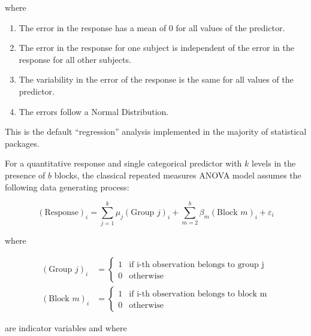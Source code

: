\documentclass[
  letterpaper,
  DIV=11,
  numbers=noendperiod]{scrreprt}
\providecommand{\tightlist}{%
  \setlength{\itemsep}{0pt}\setlength{\parskip}{0pt}}\usepackage{longtable,booktabs,array}
\theoremstyle{definition}
\theoremstyle{definition}
\theoremstyle{plain}
\theoremstyle{remark}
\begin{document}
where

\begin{enumerate}
\def\labelenumi{\arabic{enumi}.}
\tightlist
\item
  The error in the response has a mean of 0 for all values of the
  predictor.
\item
  The error in the response for one subject is independent of the error
  in the response for all other subjects.
\item
  The variability in the error of the response is the same for all
  values of the predictor.
\item
  The errors follow a Normal Distribution.
\end{enumerate}

This is the default ``regression'' analysis implemented in the majority
of statistical packages.

\begin{description}
\tightlist
\item[Classical Repeated Measures ANOVA Model
(Definition~\ref{def-classical-repeated-measures-anova})]
For a quantitative response and single categorical predictor with \(k\)
levels in the presence of \(b\) blocks, the classical repeated measures
ANOVA model assumes the following data generating process:
\end{description}

\[(\text{Response})_i = \sum_{j=1}^{k} \mu_j (\text{Group } j)_i + \sum_{m=2}^{b} \beta_m (\text{Block } m)_i + \varepsilon_i\]

where

\[
\begin{aligned}
  (\text{Group } j)_{i} &= \begin{cases}
    1 & \text{if i-th observation belongs to group j} \\
    0 & \text{otherwise}
    \end{cases} \\
  (\text{Block } m)_{i} &= \begin{cases}
    1 & \text{if i-th observation belongs to block m} \\
    0 & \text{otherwise}
    \end{cases}
\end{aligned}
\]

are indicator variables and where
\end{document}
